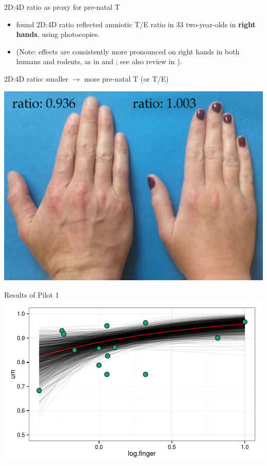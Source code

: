 \documentclass[hyperref={pdfpagelabels=false}]{beamer}
\begin{document}
\begin{frame}{2D:4D ratio as proxy for pre-natal T}
\begin{itemize}
	\item \citet{lutchmayaetal2004} found 2D:4D ratio reflected amniotic T/E ratio in 33 two-year-olds in \textbf{right hands}, using photocopies.
	\item (Note: effects are consistently more pronounced on right hands in both humans and rodents, as in \citealt{brownetal2002} and \citealt{talarovicovaetal2009}; see also review in \citealt{cohenbendahanetal2005}).
\end{itemize}

\end{frame}


\begin{frame}{2D:4D ratio: smaller $\rightarrow$ more pre-natal T (or T/E)}
\begin{center}
	\includegraphics[width=1.12\textwidth]{figures/realhands2.jpg}
\end{center}
\end{frame}


\begin{frame}{Results of Pilot 1}
\includegraphics[width=1.12\textwidth]{figures/fingereffect.pdf}
\end{frame}
\end{document}
